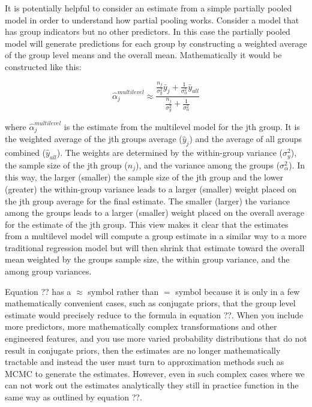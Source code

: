 It is potentially helpful to consider an estimate from a simple partially pooled model in order to understand how partial pooling works. Consider a model that has group indicators but no other predictors. In this case the partially pooled model will generate predictions for each group by constructing a weighted average of the group level means and the overall mean. Mathematically it would be constructed like this:

\begin{equation}
\hat{\alpha}_j^{multilevel} \approx \frac{ \frac{n_j}{\sigma_y^2} \bar{y}_j + \frac{1}{\sigma_{\alpha}^2} \bar{y}_{all} }{ \frac{n_j}{\sigma_y^2} + \frac{1}{\sigma_{\alpha}^2} }
\end{equation}

where $\hat{\alpha}_j^{multilevel}$ is the estimate from the multilevel model for the jth group. It is the weighted average of the jth groups average ($\hat{y}_j$) and the average of all groups combined ($\hat{y}_{all}$). The weights are determined by the within-group variance ($\sigma_y^2$), the sample size of the jth group ($n_j$), and the variance among the groups ($\sigma_{\alpha}^2$). In this way, the larger (smaller) the sample size of the jth group and the lower (greater) the within-group variance leads to a larger (smaller) weight placed on the jth group average for the final estimate. The smaller (larger) the variance among the groups leads to a larger (smaller) weight placed on the overall average for the estimate of the jth group. This view makes it clear that the estimates from a multilevel model will compute a group estimate in a similar way to a more traditional regression model but will then shrink that estimate toward the overall mean weighted by the groups sample size, the within group variance, and the among group variances.

Equation ?? has a $\approx$ symbol rather than $=$ symbol because it is only in a few mathematically convenient cases, such as conjugate priors, that the group level estimate would precisely reduce to the formula in equation ??. When you include more predictors, more mathematically complex transformations and other engineered features, and you use more varied probability distributions that do not result in conjugate priors, then the estimates are no longer mathematically tractable and instead the user must turn to approximation methods such as MCMC to generate the estimates. However, even in such complex cases where we can not work out the estimates analytically they still in practice function in the same way as outlined by equation ??.

